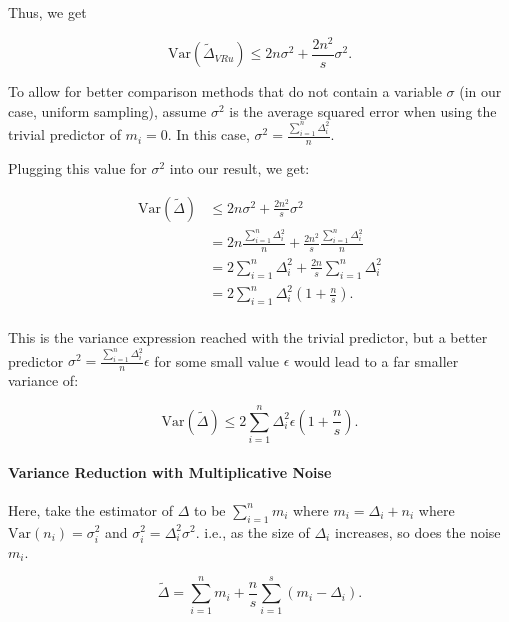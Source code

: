\documentclass[11pt, margin=1in]{article}
\begin{document}
Thus, we get

\begin{equation}
    \mathrm{Var}\left(\tilde{\Delta}_{VRu}\right) \leq 2n \sigma^2 + \frac{2n^2}{s} \sigma^2.
\label{eq:Var_Delta_VRu}
\end{equation}

To allow for better comparison methods that do not contain a variable $\sigma$ (in our case, uniform sampling), assume $\sigma^2$ is the average squared error when using the trivial predictor of $m_i = 0$.
In this case, $\sigma^2 = \frac{\sum_{i = 1}^{n}\Delta_i^2}{n}$.

Plugging this value for $\sigma^2$ into our result, we get:

\[
\begin{aligned}
\mathrm{Var}\left(\tilde{\Delta}\right) &\leq 2n \sigma^2 + \frac{2n^2}{s} \sigma^2 \\
&= 2n \frac{\sum_{i = 1}^{n}\Delta_i^2}{n} + \frac{2n^2}{s} \frac{\sum_{i = 1}^{n}\Delta_i^2}{n} \\
&= 2\sum_{i = 1}^{n}\Delta_i^2 + \frac{2n}{s} \sum_{i = 1}^{n}\Delta_i^2 \\
&= 2\sum_{i = 1}^{n}\Delta_i^2\left(1 + \frac{n}{s}\right). \\
\end{aligned}
\]

This is the variance expression reached with the trivial predictor, but a better predictor $\sigma^2 = \frac{\sum_{i = 1}^{n}\Delta_i^2}{n} \epsilon$ for some small value $\epsilon$ would lead to a far smaller variance of:

\[
\mathrm{Var}\left(\tilde{\Delta}\right) \leq 2\sum_{i = 1}^{n}\Delta_i^2 \epsilon \left(1 + \frac{n}{s}\right).
\]

\paragraph{Variance Reduction with Multiplicative Noise}

Here, take the estimator of $\Delta$ to be $\sum_{i = 1}^{n} m_i$ where $m_i = \Delta_i + n_i$ where $\mathrm{Var}(n_i) = \sigma_i^2$ and $\sigma_i^2 = \Delta_i^2 \sigma^2$.
i.e., as the size of $\Delta_i$ increases, so does the noise $m_i$.

\[
\tilde{\Delta} = \sum_{i = 1}^{n} m_i + \frac{n}{s} \sum_{i = 1}^{s} \left(m_i - \Delta_i\right).
\]
\end{document}
